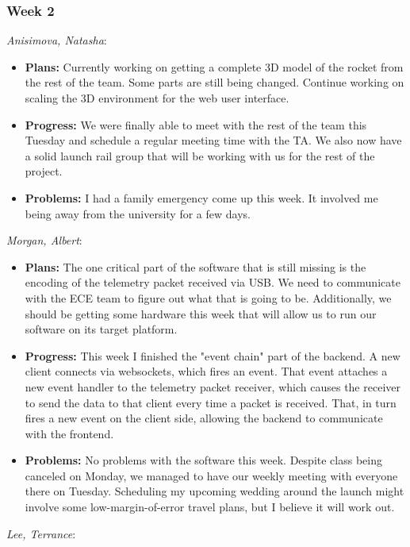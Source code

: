 \documentclass[10pt,draftclsnofoot,onecolumn]{IEEEtran}
\newcommand{\subsubsubsection}[1]{
	\hfill\break\textit{#1}:
}
\begin{document}
\subsubsection{Week 2}
\subsubsubsection{Anisimova, Natasha}
\begin{itemize}
	\item \textbf{Plans: }
	Currently working on getting a complete 3D model of the rocket from the rest of the team. Some parts are still being changed. Continue working on scaling the 3D environment for the web user interface.
	\item \textbf{Progress: }
	We were finally able to meet with the rest of the team this Tuesday and schedule a regular meeting time with the TA. We also now have a solid launch rail group that will be working with us for the rest of the project.
	\item \textbf{Problems: }
	I had a family emergency come up this week. It involved me being away from the university for a few days.
\end{itemize}
\subsubsubsection{Morgan, Albert}
\begin{itemize}
	\item \textbf{Plans: }
	The one critical part of the software that is still missing is the encoding of the telemetry packet received via USB. We need to communicate with the ECE team to figure out what that is going to be. Additionally, we should be getting some hardware this week that will allow us to run our software on its target platform.
	\item \textbf{Progress: }
	This week I finished the "event chain" part of the backend. A new client connects via websockets, which fires an event. That event attaches a new event handler to the telemetry packet receiver, which causes the receiver to send the data to that client every time a packet is received. That, in turn fires a new event on the client side, allowing the backend to communicate with the frontend.
	\item \textbf{Problems: }
	No problems with the software this week. Despite class being canceled on Monday, we managed to have our weekly meeting with everyone there on Tuesday. Scheduling my upcoming wedding around the launch might involve some low-margin-of-error travel plans, but I believe it will work out.
\end{itemize}
\subsubsubsection{Lee, Terrance}
\end{document}
